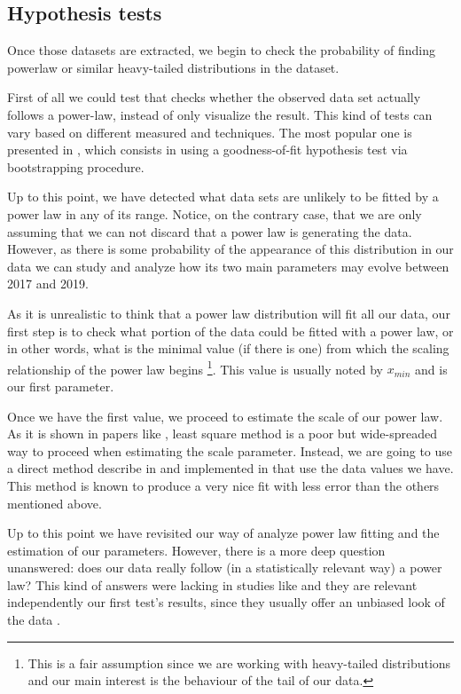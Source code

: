 \documentclass[conference]{IEEEtran}
\begin{document}
\subsection{Hypothesis tests}

Once those datasets are extracted, we begin to check the probability
of finding powerlaw or similar heavy-tailed distributions in the
dataset.

First of all we could test that checks whether the observed data set
actually follows a power-law, instead of only visualize the result.
This kind of tests can vary based on different measured and
techniques. The most popular one is presented in
\cite{clauset2009power}, which consists in using a goodness-of-fit
hypothesis test via bootstrapping procedure.

Up to this point, we have detected what data sets are unlikely to be
fitted by a power law in any of its range. Notice, on the contrary
case, that we are only assuming that we can not discard that a power
law is generating the data.  However, as there is some probability of
the appearance of this distribution in our data we can study and
analyze how its two main parameters may evolve between 2017 and 2019.

As it is unrealistic to think that a power law distribution will fit
all our data, our first step is to check what portion of the data
could be fitted with a power law, or in other words, what is the
minimal value (if there is one) from which the scaling relationship of
the power law begins \footnote{This is a fair assumption since we are
  working with heavy-tailed distributions and our main interest is the
  behaviour of the tail of our data.}.  This value is usually noted by
$x_{min}$ and is our first parameter.

Once we have the first value, we proceed to estimate the scale of our
power law.  As it is shown in papers like \cite{newman2005power,
  clauset2009power}, least square method is a poor but wide-spreaded
way to proceed when estimating the scale parameter. Instead, we are
going to use a direct method describe in \cite{clauset2009power} and
implemented in \cite{alstott2014powerlaw} that use the data values we
have. This method is known to produce a very nice fit with less error
than the others mentioned above.

Up to this point we have revisited our way of analyze power law
fitting and the estimation of our parameters. However, there is a more
deep question unanswered: does our data really follow (in a
statistically relevant way) a power law?  This kind of answers were
lacking in studies like \cite{merelo2017self} and they are relevant independently
our first test's results, since they usually offer an unbiased look of
the data .
\end{document}
